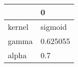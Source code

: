 \begin{tabular}{ll}
\toprule
{} &         0 \\
\midrule
kernel &   sigmoid \\
gamma  &  0.625055 \\
alpha  &       0.7 \\
\bottomrule
\end{tabular}
